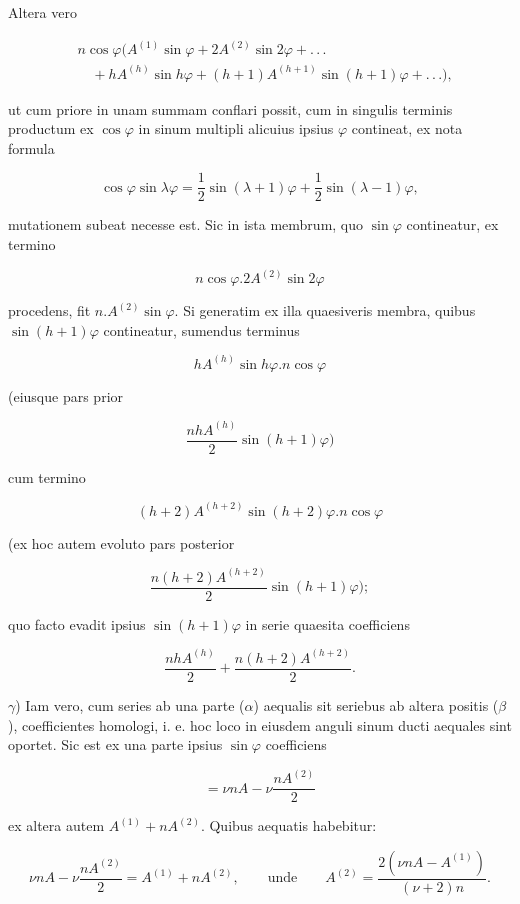 \par\noindent{}%
\hspace*{\parindent}Altera vero

\[
\begin{aligned}
&n\cos\varphi\bigl(A^{(1)}\sin\varphi+2A^{(2)}\sin2\varphi+.\,.\,.\\&\quad+hA^{(h)}\sin h\varphi+(h+1)A^{(h+1)}\sin(h+1)\varphi+.\,.\,.\bigr),
\end{aligned}
\]

\noindent ut cum priore in unam summam conflari possit, cum in singulis terminis productum ex
$\cos\varphi$ in sinum multipli alicuius ipsius $\varphi$ contineat, ex nota formula

\[
\cos\varphi\sin\lambda\varphi=\frac{1}{2}\sin(\lambda+1)\varphi+\frac{1}{2}\sin(\lambda-1)\varphi,
\]

\noindent mutationem subeat necesse est. Sic in ista membrum, quo $\sin\varphi$ contineatur, ex
termino

\[
n\cos\varphi.2A^{(2)}\sin2\varphi
\]

\noindent procedens, fit $n.A^{(2)}\sin\varphi$. Si generatim ex illa quaesiveris membra, quibus
$\sin(h+1)\varphi$ contineatur, sumendus terminus

\[
hA^{(h)}\sin h\varphi.n\cos\varphi
\]

\noindent (eiusque pars prior

\[
\frac{nhA^{(h)}}{2}\sin(h+1)\varphi)
\]

\noindent cum termino

\[
(h+2)A^{(h+2)}\sin(h+2)\varphi.n\cos\varphi
\]

\noindent (ex hoc autem evoluto pars posterior

\[
\frac{n(h+2)A^{(h+2)}}{2}\sin(h+1)\varphi);
\]

\noindent quo facto evadit ipsius $\sin(h+1)\varphi$ in serie quaesita coefficiens

\[
\frac{nhA^{(h)}}{2}+\frac{n(h+2)A^{(h+2)}}{2}.
\]

$\gamma$) Iam vero, cum series ab una parte ($\alpha$) aequalis sit seriebus ab altera positis
($\beta$), coefficientes homologi, i. e. hoc loco in eiusdem anguli sinum ducti aequales
sint oportet. Sic est ex una parte ipsius $\sin\varphi$ coefficiens

\[
=\nu nA-\nu\frac{nA^{(2)}}{2}
\]

\noindent ex altera autem $A^{(1)}+nA^{(2)}$. Quibus aequatis habebitur:

\[
\nu nA-\nu\frac{nA^{(2)}}{2}=A^{(1)}+nA^{(2)},\qquad\mbox{unde}\qquad A^{(2)}=\frac{2(\nu nA-A^{(1)})}{(\nu+2)n}.
\]

